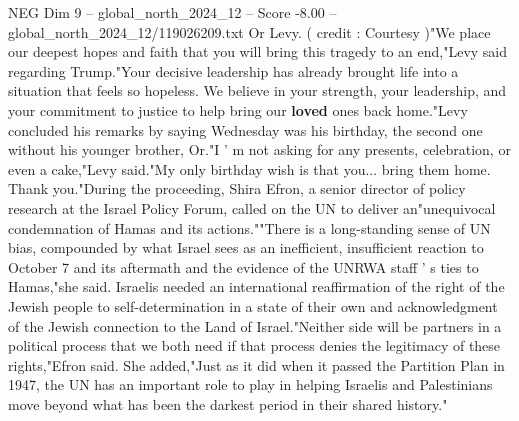 \begin{textsample}{NEG Dim 9 – global\_north\_2024\_12 – Score -8.00 – global\_north\_2024\_12/119026209.txt}
Or Levy. ( credit : Courtesy )"We place our deepest hopes and faith that you will bring this tragedy to an end,"Levy said regarding Trump."Your decisive leadership has already brought life into a situation that feels so hopeless.
We believe in your strength, your leadership, and your commitment to justice to help bring our \textbf{loved} ones back home."Levy concluded his remarks by saying Wednesday was his birthday, the second one without his younger brother, Or."I ' m not asking for any presents, celebration, or even a cake,"Levy said."My only birthday wish is that you... bring them home.
Thank you."During the proceeding, Shira Efron, a senior director of policy research at the Israel Policy Forum, called on the UN to deliver an"unequivocal condemnation of Hamas and its actions.""There is a long-standing sense of UN bias, compounded by what Israel sees as an inefficient, insufficient reaction to October 7 and its aftermath and the evidence of the UNRWA staff ' s ties to Hamas,"she said.
Israelis needed an international reaffirmation of the right of the Jewish people to self-determination in a state of their own and acknowledgment of the Jewish connection to the Land of Israel."Neither side will be partners in a political process that we both need if that process denies the legitimacy of these rights,"Efron said.
She added,"Just as it did when it passed the Partition Plan in 1947, the UN has an important role to play in helping Israelis and Palestinians move beyond what has been the darkest period in their shared history."

\end{textsample}
